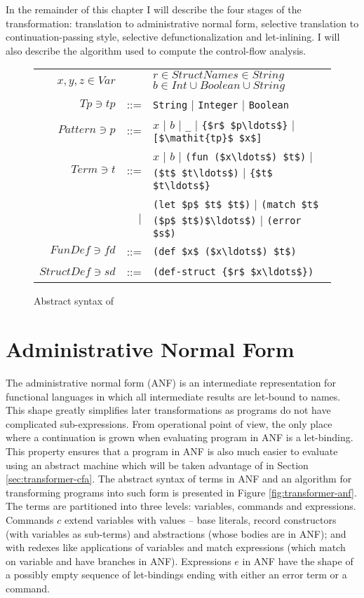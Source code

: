 In the remainder of this chapter I will describe the four stages of the transformation: translation to administrative normal form, selective translation to continuation-passing style, selective defunctionalization and let-inlining.
I will also describe the algorithm used to compute the control-flow analysis.


\begin{figure}
\begin{center}
\begingroup
\setlength{\tabcolsep}{2pt}
\begin{tabular}{rrl}
  $x, y, z \in Var$ && $r\in StructName$\quad$s \in String$ \quad $b \in Int \cup Boolean \cup String$\\
  $Tp \ni \mathit{tp} $ &::=& \lstinline!String! | \lstinline!Integer! | \lstinline!Boolean!\\
  $Pattern \ni p $ &::=& $x$ | $b$ | \lstinline!_! | \lstinline!{$r$ $p\ldots$}! |  \lstinline![$\mathit{tp}$ $x$]!\\
  $Term \ni t$ &::=& $x$ | $b$
              | \lstinline!(fun ($x\ldots$) $t$)!
              | \lstinline!($t$ $t\ldots$)!
              | \lstinline!{$t$ $t\ldots$}!\\
              &|& \lstinline!(let $p$ $t$ $t$)!
              | \lstinline!(match $t$ ($p$ $t$)$\ldots$)!
              | \lstinline!(error $s$)!\\
  $FunDef \ni \mathit{fd}$ &::=& \lstinline!(def $x$ ($x\ldots$) $t$)!\\
  $StructDef \ni \mathit{sd}$ &::=& \lstinline!(def-struct {$r$ $x\ldots$})!\\
\end{tabular}
\endgroup
\end{center}
\caption{Abstract syntax of \IDL{}}\label{fig:idl-abs-syntax}
\end{figure}


\section{Administrative Normal Form}
The administrative normal form (ANF) \cite{flanagan-anf} is an intermediate representation for functional languages in which all intermediate results are let-bound to names.
This shape greatly simplifies later transformations as programs do not have complicated sub-expressions.
From operational point of view, the only place where a continuation is grown when evaluating program in ANF is a let-binding.
This property ensures that a program in ANF is also much easier to evaluate using an abstract machine which will be taken advantage of in Section \ref{sec:transformer-cfa}.
The abstract syntax of terms in ANF and an algorithm for transforming \IDL{} programs into such form is presented in Figure \ref{fig:transformer-anf}.
The terms are partitioned into three levels: variables, commands and expressions.
Commands $c$ extend variables with values -- base literals, record constructors (with variables as sub-terms) and abstractions (whose bodies are in ANF); and with redexes like applications of variables and match expressions (which match on variable and have branches in ANF).
Expressions $e$ in ANF have the shape of a possibly empty sequence of let-bindings ending with either an error term or a command.

